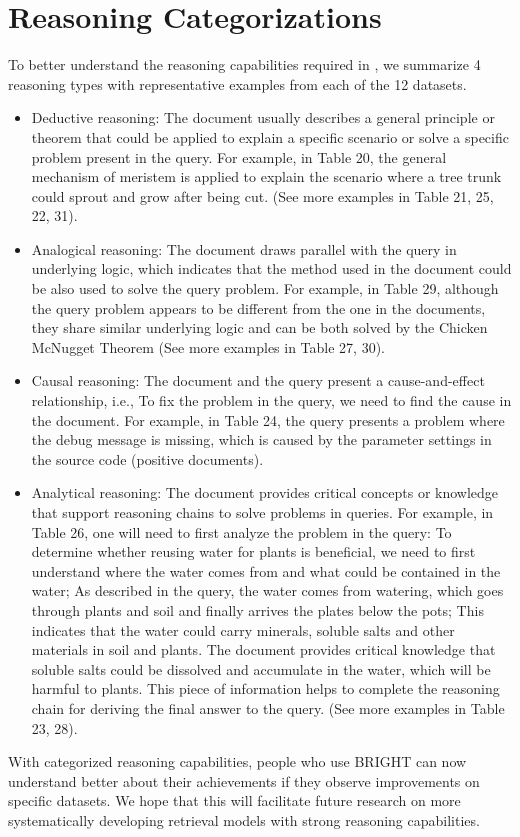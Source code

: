 \section{Reasoning Categorizations}
To better understand the reasoning capabilities required in \ours, we summarize 4 reasoning types with representative examples from each of the 12 \ours datasets.
\begin{itemize}
    \item Deductive reasoning: The document usually describes a general principle or theorem that could be applied to explain a specific scenario or solve a specific problem present in the query. For example, in Table 20, the general mechanism of meristem is applied to explain the scenario where a tree trunk could sprout and grow after being cut. (See more examples in Table 21, 25, 22, 31).
    \item Analogical reasoning: The document draws parallel with the query in underlying logic, which indicates that the method used in the document could be also used to solve the query problem. For example, in Table 29, although the query problem appears to be different from the one in the documents, they share similar underlying logic and can be both solved by the Chicken McNugget Theorem (See more examples in Table 27, 30).
    \item Causal reasoning: The document and the query present a cause-and-effect relationship, i.e., To fix the problem in the query, we need to find the cause in the document. For example, in Table 24, the query presents a problem where the debug message is missing, which is caused by the parameter settings in the source code (positive documents).
    \item Analytical reasoning: The document provides critical concepts or knowledge that support reasoning chains to solve problems in queries. For example, in Table 26, one will need to first analyze the problem in the query: To determine whether reusing water for plants is beneficial, we need to first understand where the water comes from and what could be contained in the water; As described in the query, the water comes from watering, which goes through plants and soil and finally arrives the plates below the pots; This indicates that the water could carry minerals, soluble salts and other materials in soil and plants. The document provides critical knowledge that soluble salts could be dissolved and accumulate in the water, which will be harmful to plants. This piece of information helps to complete the reasoning chain for deriving the final answer to the query. (See more examples in Table 23, 28).
\end{itemize}

With categorized reasoning capabilities, people who use BRIGHT can now understand better about their achievements if they observe improvements on specific datasets.
We hope that this will facilitate future research on more systematically developing retrieval models with strong reasoning capabilities.